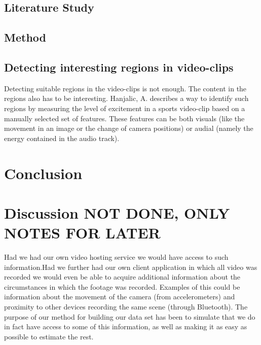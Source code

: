 \documentclass[12pt]{article}
\begin{document}
\subsection{Literature Study}
%

%
\subsection{Method}
%

%
\subsection{Detecting interesting regions in video-clips}
Detecting suitable regions in the video-clips is not enough. The content in the regions also has to be interesting. Hanjalic, A. \cite{citeulike:405480} describes a way to identify such regions by measuring the level of excitement in a sports video-clip based on a manually selected set of features. These features can be both visuals (like the movement in an image or the change of camera positions) or audial (namely the energy contained in the audio track).%
%
\section{Conclusion}
%
\section{Discussion NOT DONE, ONLY NOTES FOR LATER}
%
Had we had our own video hosting service we would have access to such information.Had we further had our own client application in which all video was recorded we would even be able to acquire additional information about the circumstances in which the footage was recorded. Examples of this could be information about the movement of the camera (from accelerometers) and proximity to other devices recording the same scene (through Bluetooth). The purpose of our method for building our data set has been to simulate that we do in fact have access to some of this information, as well as making it as easy as possible to estimate the rest.
%
\newpage


\end{document}
